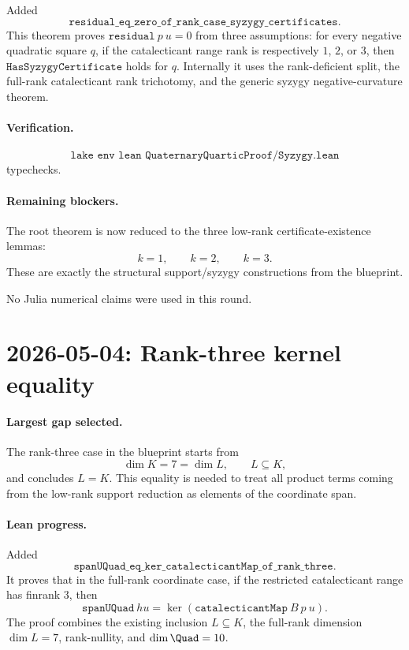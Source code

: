 \documentclass[11pt]{article}
\begin{document}
Added
\[
\texttt{residual\_eq\_zero\_of\_rank\_case\_syzygy\_certificates}.
\]
This theorem proves \(\texttt{residual}\ p\ u=0\) from three assumptions:
for every negative quadratic square \(q\), if the catalecticant range rank is
respectively \(1\), \(2\), or \(3\), then \(\texttt{HasSyzygyCertificate}\)
holds for \(q\).  Internally it uses the rank-deficient split, the full-rank
catalecticant rank trichotomy, and the generic syzygy negative-curvature
theorem.

\paragraph{Verification.}
\[
\texttt{lake env lean QuaternaryQuarticProof/Syzygy.lean}
\]
typechecks.

\paragraph{Remaining blockers.}
The root theorem is now reduced to the three low-rank certificate-existence
lemmas:
\[
k=1,\qquad k=2,\qquad k=3.
\]
These are exactly the structural support/syzygy constructions from the
blueprint.

No Julia numerical claims were used in this round.

\section*{2026-05-04: Rank-three kernel equality}

\paragraph{Largest gap selected.}
The rank-three case in the blueprint starts from
\[
\dim K=7=\dim L,\qquad L\subseteq K,
\]
and concludes \(L=K\).  This equality is needed to treat all product terms
coming from the low-rank support reduction as elements of the coordinate span.

\paragraph{Lean progress.}
Added
\[
\texttt{spanUQuad\_eq\_ker\_catalecticantMap\_of\_rank\_three}.
\]
It proves that in the full-rank coordinate case, if the restricted
catalecticant range has finrank \(3\), then
\[
\texttt{spanUQuad}\ hu
=\ker(\texttt{catalecticantMap}\ B\ p\ u).
\]
The proof combines the existing inclusion \(L\subseteq K\), the full-rank
dimension \(\dim L=7\), rank-nullity, and \(\dim\Quad=10\).
\end{document}
